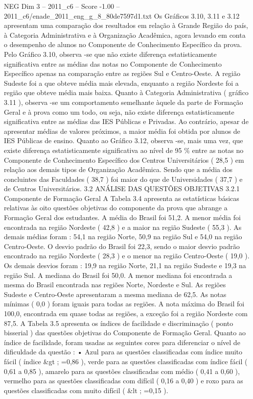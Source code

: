 \begin{textsample}{NEG Dim 3 – 2011\_c6 – Score -1.00 – 2011\_c6/enade\_2011\_eng\_g\_8\_80de7597d1.txt}
Os Gráficos 3.10, 3.11 e 3.12 apresentam uma comparação dos resultados em relação à Grande Região do país, à Categoria Administrativa e à Organização Acadêmica, agora levando em conta o desempenho de alunos no Componente de Conhecimento Específico da prova.
Pelo Gráfico 3.10, observa -se que não existe diferença estatisticamente significativa entre as médias das notas no Componente de Conhecimento Específico apenas na comparação entre as regiões Sul e Centro-Oeste.
A região Sudeste foi a que obteve média mais elevada, enquanto a região Nordeste foi a região que obteve média mais baixa.
Quanto à Categoria Administrativa ( gráfico 3.11 ), observa -se um comportamento semelhante àquele da parte de Formação Geral e à prova como um todo, ou seja, não existe diferença estatisticamente significativa entre as médias das IES Públicas e Privadas.
Ao contrário, apesar de apresentar médias de valores próximos, a maior média foi obtida por alunos de IES Públicas de ensino.
Quanto ao Gráfico 3.12, observa -se, mais uma vez, que existe diferença estatisticamente significativa ao nível de 95 \% entre as notas no Componente de Conhecimento Específico dos Centros Universitários ( 28,5 ) em relação aos demais tipos de Organização Acadêmica.
Sendo que a média dos concluintes das Faculdades ( 38,7 ) foi maior do que de Universidades ( 37,7 ) e de Centros Universitários. 3.2 ANÁLISE DAS QUESTÕES OBJETIVAS 3.2.1 Componente de Formação Geral A Tabela 3.4 apresenta as estatísticas básicas relativas às oito questões objetivas do componente da prova que abrange a Formação Geral dos estudantes.
A média do Brasil foi 51,2.
A menor média foi encontrada na região Nordeste ( 42,8 ) e a maior na região Sudeste ( 55,3 ).
As demais médias foram : 54,1 na região Norte, 50,9 na região Sul e 54,0 na região Centro-Oeste.
O desvio padrão do Brasil foi 22,3, sendo o maior desvio padrão encontrado na região Nordeste ( 28,3 ) e o menor na região Centro-Oeste ( 19,0 ).
Os demais desvios foram : 19,9 na região Norte, 21,1 na região Sudeste e 19,3 na região Sul.
A mediana do Brasil foi 50,0.
A menor mediana foi encontrada a mesma do Brasil encontrada nas regiões Norte, Nordeste e Sul.
As regiões Sudeste e Centro-Oeste apresentaram a mesma mediana de 62,5.
As notas mínimas ( 0,0 ) foram iguais para todas as regiões.
A nota máxima do Brasil foi 100,0, encontrada em quase todas as regiões, a exceção foi a região Nordeste com 87,5.
A Tabela 3.5 apresenta os índices de facilidade e discriminação ( ponto bisserial ) das questões objetivas do Componente de Formação Geral.
Quanto ao índice de facilidade, foram usadas as seguintes cores para diferenciar o nível de dificuldade da questão : • Azul para as questões classificadas com índice muito fácil ( índice \&gt ; =0,86 ), verde para as questões classificadas com índice fácil ( 0,61 a 0,85 ), amarelo para as questões classificadas com médio ( 0,41 a 0,60 ), vermelho para as questões classificadas com difícil ( 0,16 a 0,40 ) e roxo para as questões classificadas com muito difícil ( \&lt ; =0,15 ).

\end{textsample}
